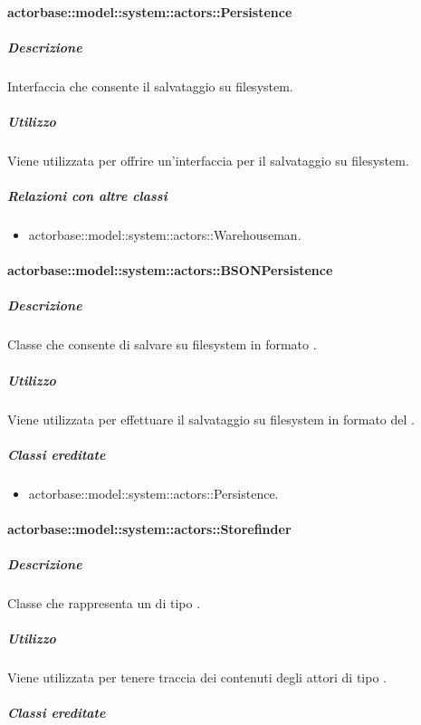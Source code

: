 \documentclass{scalatekids-article}
\begin{document}
\paragraph{actorbase::model::system::actors::Persistence}

\subparagraph{Descrizione}

Interfaccia che consente il salvataggio su filesystem.

\subparagraph{Utilizzo}

Viene utilizzata per offrire un'interfaccia per il salvataggio su filesystem.

\subparagraph{Relazioni con altre classi}

\begin{itemize}
\item actorbase::model::system::actors::Warehouseman.
\end{itemize}

\paragraph{actorbase::model::system::actors::BSONPersistence}

\subparagraph{Descrizione}

Classe che consente di salvare su filesystem in formato .

\subparagraph{Utilizzo}

Viene utilizzata per effettuare il salvataggio su filesystem in formato  del .

\subparagraph{Classi ereditate}

\begin{itemize}
\item actorbase::model::system::actors::Persistence.
\end{itemize}

\paragraph{actorbase::model::system::actors::Storefinder}

\subparagraph{Descrizione}

Classe che rappresenta un  di tipo .

\subparagraph{Utilizzo}

Viene utilizzata per tenere traccia dei contenuti degli attori di tipo .

\subparagraph{Classi ereditate}
\end{document}
